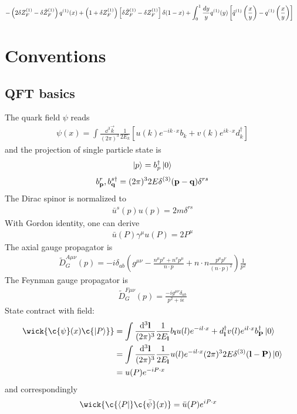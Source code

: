 \documentclass{article}
\DeclarePairedDelimiter\BraceM\{\}
\DeclarePairedDelimiter\bracketM{[}{]}
\let\Bqty\relax
\let\bqty\relax
\newcommand{\Bqty}[1]{\BraceM*{#1}}
\newcommand{\bqty}[1]{\bracketM*{#1}}
\newcommand{\mme}[1]{\frac{\dd^3\vb{#1}}{(2\pi)^3}}
\begin{document}
\begin{align}
\begin{aligned}[t]
		-\left(2\delta Z_{F}^{(1)}-\delta \tilde{Z}_{F}^{(1)}\right)q^{(1)}(x)+\left(1+\delta Z_{F}^{(1)}\right)\left[\delta \tilde{Z}_{F}^{(1)}-\delta Z_{F}^{(1)}\right] \delta(1-x)+\int_{0}^{1} \frac{d y}{y}q^{(1)}(y)\left[\tilde{q}^{(1)}\left(\frac{x}{y}\right)-q^{(1)}\left(\frac{x}{y}\right)\right] &
	\end{aligned}\notag \\
\end{align}

\appendix
\clearpage
\section{Conventions\label{sec:conv}}
\subsection{QFT basics}
The quark field $\psi$ reads
\begin{align}
	\psi(x)=\int \frac{\dd^{3} \vec{k}}{(2 \pi)^{3}} \frac{1}{2 E_{k}}\left[u(k) e^{-i k \cdot x} b_{k}+v(k)e^{ik\cdot x} d_{k}^{\dagger}\right]
\end{align}
and the projection of single particle state is
\begin{align}
	\ket{p}=b_p^{\dagger}\ket{0}
\end{align}
\begin{align}
	\Bqty{b_{\vb{p}}^r,b_{\vb{q}}^{s\dagger}}=(2\pi)^32E\delta^{(3)}(\vb{p}-\vb{q})\delta^{rs}
\end{align}
The Dirac spinor is normalized to
\begin{align}
	\bar u^s(p) u(p)=2m\delta^{rs}
\end{align}
With Gordon identity, one can derive\cite{Srednicki2007}
\begin{align}
	\bar u(P) \gamma^\mu u(P) =2P^\mu
\end{align}
The axial gauge propagator is
\begin{align}
	\tilde D_G^{A\mu\nu}(p)=-i \delta_{a b}\left(g^{\mu \nu}-\frac{n^{\mu} p^{\nu}+n^{\nu} p^{\mu}}{n \cdot p}+n \cdot n \frac{p^{\mu} p^{\nu}}{(n \cdot p)^{2}}\right) \frac{1}{p^{2}}
\end{align}
The Feynman gauge propagator is
\begin{align}
	\tilde D_G^{F\mu\nu}(p)= \frac{-i g^{\mu\nu} \delta_{a b}}{p^{2}+i\epsilon}
\end{align}
State contract with field:
\begin{align}
	\wick{\c{\psi}(x)\c{\ket{P}}} & =\int\mme{l}\frac{1}{2E_{\vb{l}}}\bqty{b_{\vb{l}}u(l)e^{-il\cdot x}+d_{\vb{l}}^{\dagger}v(l)e^{il\cdot x}}b_{\vb{P}}^{\dagger}\ket{0}\notag \\
	                              & =\int\mme{l}\frac{1}{2E_{\vb{l}}}u(l)e^{-il\cdot x}(2\pi)^32E\delta^{(3)}(\vb{l}-\vb{P})\ket{0}\notag                                       \\
	                              & =u(P)e^{-iP\cdot x}
\end{align}
and correspondingly
\begin{align}
	\wick{\c{\bra{P}}\c{\bar\psi}(x)} & =\bar u(P)e^{iP\cdot x}
\end{align}
\end{document}
